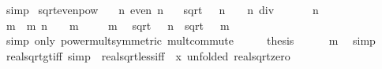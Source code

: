 \begin{isabellebody}
\ simp%
\endisatagproof
{\isafoldproof}%
%
\isadelimproof
\isanewline
%
\endisadelimproof
\isanewline
{}\isamarkupfalse%
\ sqrt{\isacharunderscore}{\kern0pt}even{\isacharunderscore}{\kern0pt}pow{}{\isacharcolon}{\kern0pt}\isanewline
\ \ \ n{\isacharcolon}{\kern0pt}\ {\isachardoublequoteopen}even\ n{\isachardoublequoteclose}\isanewline
\ \ \ {\isachardoublequoteopen}sqrt\ {\isacharparenleft}{\kern0pt}{}\ {\isacharcircum}{\kern0pt}\ n{\isacharparenright}{\kern0pt}\ {\isacharequal}{\kern0pt}\ {}\ {\isacharcircum}{\kern0pt}\ {\isacharparenleft}{\kern0pt}n\ div\ {}{\isacharparenright}{\kern0pt}{\isachardoublequoteclose}\isanewline
%
\isadelimproof
%
\endisadelimproof
%
\isatagproof
{}\isamarkupfalse%
\ {\isacharminus}{\kern0pt}\isanewline
\ \ \isamarkupfalse%
\ n\ \isamarkupfalse%
\ m\ \ m{\isacharcolon}{\kern0pt}\ {\isachardoublequoteopen}n\ {\isacharequal}{\kern0pt}\ {}\ {\isacharasterisk}{\kern0pt}\ m{\isachardoublequoteclose}\ \isacommand{{\isachardot}{\kern0pt}{\isachardot}{\kern0pt}}\isamarkupfalse%
\isanewline
\ \ \isamarkupfalse%
\ m\ \isamarkupfalse%
\ {\isachardoublequoteopen}sqrt\ {\isacharparenleft}{\kern0pt}{}\ {\isacharcircum}{\kern0pt}\ n{\isacharparenright}{\kern0pt}\ {\isacharequal}{\kern0pt}\ sqrt\ {\isacharparenleft}{\kern0pt}{\isacharparenleft}{\kern0pt}{}\ {\isacharcircum}{\kern0pt}\ m{\isacharparenright}{\kern0pt}\isanewline
\ \ \ \ \isamarkupfalse%
\ {\isacharparenleft}{\kern0pt}simp\ only{\isacharcolon}{\kern0pt}\ power{\isacharunderscore}{\kern0pt}mult{\isacharbrackleft}{\kern0pt}symmetric{\isacharbrackright}{\kern0pt}\ mult{\isachardot}{\kern0pt}commute{\isacharparenright}{\kern0pt}\isanewline
\ \ \isamarkupfalse%
\ \isamarkupfalse%
\ {\isacharquery}{\kern0pt}thesis\isanewline
\ \ \ \ \isamarkupfalse%
\ m\ \isamarkupfalse%
\ simp\isanewline
{}\isamarkupfalse%
%
\endisatagproof
{\isafoldproof}%
%
\isadelimproof
\isanewline
%
\endisadelimproof
\isanewline
{}\isamarkupfalse%
\ real{\isacharunderscore}{\kern0pt}sqrt{\isacharunderscore}{\kern0pt}gt{\isacharunderscore}{\kern0pt}{}{\isacharunderscore}{\kern0pt}iff\ {\isacharbrackleft}{\kern0pt}simp{\isacharbrackright}{\kern0pt}\ {\isacharequal}{\kern0pt}\ real{\isacharunderscore}{\kern0pt}sqrt{\isacharunderscore}{\kern0pt}less{\isacharunderscore}{\kern0pt}iff\ {\isacharbrackleft}{\kern0pt}\ x{\isacharequal}{\kern0pt}{}{\isacharcomma}{\kern0pt}\ unfolded\ real{\isacharunderscore}{\kern0pt}sqrt{\isacharunderscore}{\kern0pt}zero{\isacharbrackright}{\kern0pt}\isanewline

\end{isabellebody}
